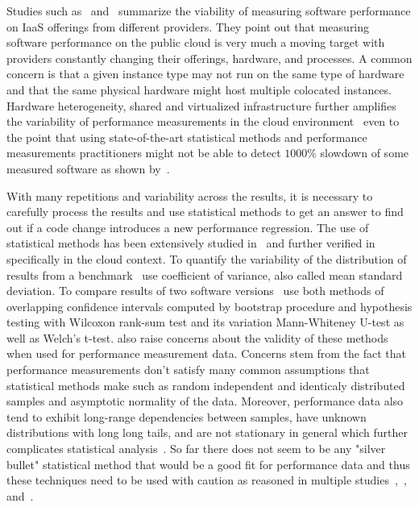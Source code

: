Studies such as~\citet{leitner2016patterns} and~\citet{laaber2019software} summarize the viability of measuring software performance on IaaS offerings from different providers.
They point out that measuring software performance on the public cloud is very much a moving target with providers constantly changing their offerings, hardware, and processes.
A common concern is that a given instance type may not run on the same type of hardware and that the same physical hardware might host multiple colocated instances.
Hardware heterogeneity, shared and virtualized infrastructure further amplifies the variability of performance measurements in the cloud environment~\cite{leitner2016patterns} even to the point that using state-of-the-art statistical methods and performance measurements practitioners might not be able to detect $1000\%$ slowdown of some measured software as shown by~\citet{laaber2019software}.

With many repetitions and variability across the results, it is necessary to carefully process the results and use statistical methods to get an answer to find out if a code change introduces a new performance regression.
The use of statistical methods has been extensively studied in~\citet{bulej2017stat} and further verified in~\citet{laaber2019software} specifically in the cloud context.
To quantify the variability of the distribution of results from a benchmark~\citet{laaber2019software} use coefficient of variance, also called mean standard deviation.
To compare results of two software versions~\citet{bulej2017stat} use both methods of overlapping confidence intervals computed by bootstrap procedure and hypothesis testing with Wilcoxon rank-sum test and its variation Mann-Whiteney U-test as well as Welch's t-test.
\citet{bulej2017stat} also raise concerns about the validity of these methods when used for performance measurement data.
Concerns stem from the fact that performance measurements don't satisfy many common assumptions that statistical methods make such as random independent and identicaly distributed samples and asymptotic normality of the data.
Moreover, performance data also tend to exhibit long-range dependencies between samples, have unknown distributions with long long tails, and are not stationary in general which further complicates statistical analysis~\cite{bulej2017stat}.
So far there does not seem to be any "silver bullet" statistical method that would be a good fit for performance data and thus these techniques need to be used with caution as reasoned in multiple studies~\citet{leitner2016patterns},~\citet{laaber2019software}, and~\citet{bulej2017stat}.

